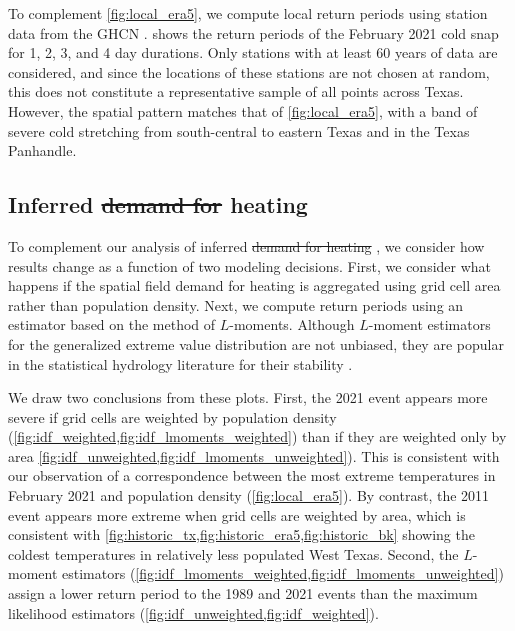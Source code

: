 \documentclass[12pt]{iopart}
\providecommand{\DIFadd}[1]{{\protect\color{blue}\uwave{#1}}} %
\providecommand{\DIFdel}[1]{{\protect\color{red}\sout{#1}}}                      %
\providecommand{\DIFaddbegin}{} %
\providecommand{\DIFaddend}{} %
\providecommand{\DIFdelbegin}{} %
\providecommand{\DIFdelend}{} %
\newcommand{\DIFscaledelfig}{0.5}
\newlength{\DIFdelgraphicswidth} %
\newlength{\DIFdelgraphicsheight} %
\newcommand{\DIFaddincludegraphics}[2][]{{\color{blue}\fbox{\DIFOincludegraphics[#1]{#2}}}} %
\newcommand{\DIFdelincludegraphics}[2][]{%
\sbox{\DIFdelgraphicsbox}{\DIFOincludegraphics[#1]{#2}}%
\settoboxwidth{\DIFdelgraphicswidth}{\DIFdelgraphicsbox} %
\settoboxtotalheight{\DIFdelgraphicsheight}{\DIFdelgraphicsbox} %
\scalebox{\DIFscaledelfig}{%
\parbox[b]{\DIFdelgraphicswidth}{\usebox{\DIFdelgraphicsbox}\\[-\baselineskip] \rule{\DIFdelgraphicswidth}{0em}}\llap{\resizebox{\DIFdelgraphicswidth}{\DIFdelgraphicsheight}{%
\setlength{\unitlength}{\DIFdelgraphicswidth}%
\begin{picture}(1,1)%
\thicklines\linethickness{2pt} %
{\color[rgb]{1,0,0}\put(0,0){\framebox(1,1){}}}%
{\color[rgb]{1,0,0}\put(0,0){\line( 1,1){1}}}%
{\color[rgb]{1,0,0}\put(0,1){\line(1,-1){1}}}%
\end{picture}%
}\hspace*{3pt}}} %
} %
\DeclareRobustCommand{\DIFaddbegin}{\DIFOaddbegin \let\includegraphics\DIFaddincludegraphics} %
\DeclareRobustCommand{\DIFaddend}{\DIFOaddend \let\includegraphics\DIFOincludegraphics} %
\DeclareRobustCommand{\DIFdelbegin}{\DIFOdelbegin \let\includegraphics\DIFdelincludegraphics} %
\DeclareRobustCommand{\DIFdelend}{\DIFOaddend \let\includegraphics\DIFOincludegraphics} %
\begin{document}
To complement \cref{fig:local_era5}, we compute local return periods using station data from the GHCN \cite{Menne:2012hk}.
 shows the return periods of the February 2021 cold snap for 1, 2, 3, and 4 day durations.
Only stations with at least 60 years of data are considered, and since the locations of these stations are not chosen at random, this does not constitute a representative sample of all points across Texas.
However, the spatial pattern matches that of \cref{fig:local_era5}, with a band of severe cold stretching from south-central to eastern Texas and in the Texas Panhandle.

\subsection{Inferred \DIFdelbegin \DIFdel{demand for }\DIFdelend heating \DIFaddbegin \DIFadd{demand per capita}\DIFaddend }

To complement our analysis of inferred \DIFdelbegin \DIFdel{demand for heating }\DIFdelend \DIFaddbegin \DIFadd{heating demand per capita}\DIFaddend , we consider how results change as a function of two modeling decisions.
First, we consider what happens if the spatial field demand for heating is aggregated using grid cell area rather than population density.
Next, we compute return periods using an estimator based on the method of $L$-moments.
Although $L$-moment estimators for the generalized extreme value distribution are not unbiased, they are popular in the statistical hydrology literature for their stability \cite{hosking_gev:1985,martins_gev:2001,morrison_gev:2002}.

We draw two conclusions from these plots.
First, the 2021 event appears more severe if grid cells are weighted by population density (\cref{fig:idf_weighted,fig:idf_lmoments_weighted}) than if they are weighted only by area \cref{fig:idf_unweighted,fig:idf_lmoments_unweighted}).
This is consistent with our observation of a correspondence between the most extreme temperatures in February 2021 and population density (\cref{fig:local_era5}).
By contrast, the 2011 event appears more extreme when grid cells are weighted by area, which is consistent with \cref{fig:historic_tx,fig:historic_era5,fig:historic_bk} showing the coldest temperatures in relatively less populated West Texas.
Second, the $L$-moment estimators (\cref{fig:idf_lmoments_weighted,fig:idf_lmoments_unweighted}) assign a lower return period to the 1989 and 2021 events than the maximum likelihood estimators (\cref{fig:idf_unweighted,fig:idf_weighted}).
\end{document}
